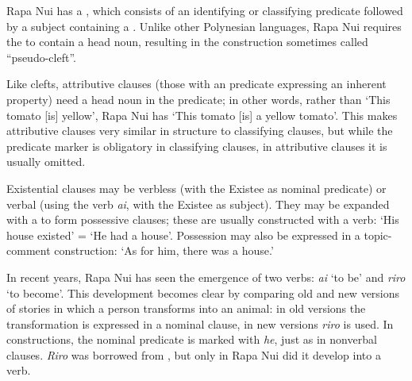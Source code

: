 Rapa Nui has a , which consists of an identifying or classifying predicate followed by a subject  containing a . Unlike other Polynesian languages, Rapa Nui requires the  to contain a head noun, resulting in the construction sometimes called “pseudo-cleft”.

Like clefts, attributive clauses (those with an  predicate expressing an inherent property) need a head noun in the predicate; in other words, rather than ‘This tomato [is] yellow’, Rapa Nui has ‘This tomato [is] a yellow tomato’. This makes attributive clauses very similar in structure to classifying clauses, but while the predicate marker is obligatory in classifying clauses, in attributive clauses it is usually omitted.

Existential clauses may be verbless (with the Existee as nominal predicate) or verbal (using the verb \textit{ai}, with the Existee as subject). They may be expanded with a  to form possessive clauses; these are usually constructed with a verb: ‘His house existed’ = ‘He had a house’. Possession may also be expressed in a topic-comment construction: ‘As for him, there was a house.’

In recent years, Rapa Nui has seen the emergence of two  verbs: \textit{ai} ‘to be’ and \textit{riro} ‘to become’. This development becomes clear by comparing old and new versions of stories in which a person transforms into an animal: in old versions the transformation is expressed in a nominal clause, in new versions \textit{riro} is used. In  constructions, the nominal predicate is marked with \textit{he}, just as in nonverbal clauses. \textit{Riro} was borrowed from , but only in Rapa Nui did it develop into a  verb.
